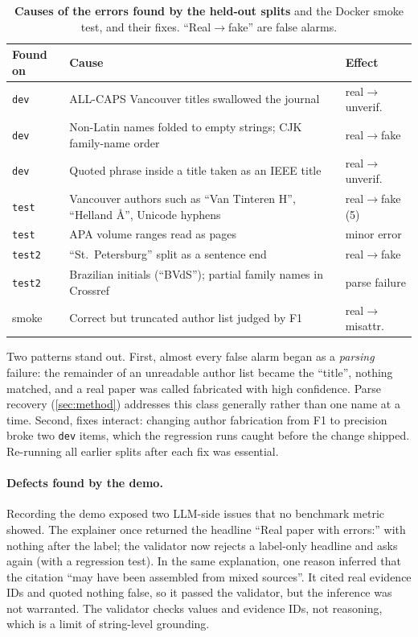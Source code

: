 \documentclass[10pt,twocolumn,a4paper]{article}
\begin{document}
\begin{table}[t]
\centering
\caption{\textbf{Causes of the errors found by the held-out splits} and the Docker smoke test, and
their fixes. ``Real$\to$fake'' are false alarms.}
\label{tab:errors}
\scriptsize
\setlength{\tabcolsep}{3pt}
\begin{tabularx}{\columnwidth}{@{}lXl@{}}
\toprule
Found on & Cause & Effect \\
\midrule
\texttt{dev} & ALL-CAPS Vancouver titles swallowed the journal & real$\to$unverif. \\
\texttt{dev} & Non-Latin names folded to empty strings; CJK family-name order & real$\to$fake \\
\texttt{dev} & Quoted phrase inside a title taken as an IEEE title & real$\to$unverif. \\
\texttt{test} & Vancouver authors such as ``Van Tinteren H'', ``Helland {\AA}'', Unicode hyphens & real$\to$fake (5) \\
\texttt{test} & APA volume ranges read as pages & minor error \\
\texttt{test2} & ``St.~Petersburg'' split as a sentence end & real$\to$fake \\
\texttt{test2} & Brazilian initials (``BVdS''); partial family names in Crossref & parse failure \\
smoke & Correct but truncated author list judged by F1 & real$\to$misattr. \\
\bottomrule
\end{tabularx}
\end{table}

Two patterns stand out. First, almost every false alarm began as a \emph{parsing} failure: the
remainder of an unreadable author list became the ``title'', nothing matched, and a real paper was
called fabricated with high confidence. Parse recovery (\cref{sec:method}) addresses this class
generally rather than one name at a time. Second, fixes interact: changing author fabrication from
F1 to precision broke two \texttt{dev} items, which the regression runs caught before the change
shipped. Re-running all earlier splits after each fix was essential.

\paragraph{Defects found by the demo.}
Recording the demo exposed two LLM-side issues that no benchmark metric showed. The explainer once
returned the headline ``Real paper with errors:'' with nothing after the label; the validator now
rejects a label-only headline and asks again (with a regression test). In the same explanation, one
reason inferred that the citation ``may have been assembled from mixed sources''. It cited real
evidence IDs and quoted nothing false, so it passed the validator, but the inference was not
warranted. The validator checks values and evidence IDs, not reasoning, which is a limit of
string-level grounding.
\end{document}
